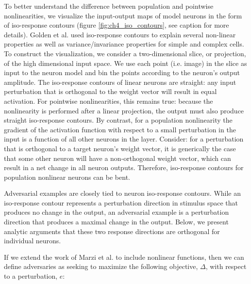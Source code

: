 To better understand the difference between population and pointwise nonlinearities, we visualize the input-output maps of model neurons in the form of iso-response contours (figure \ref{fig:ch4_iso_contours}, see caption for more details). Golden et al. \citeyearpar{golden2016conjectures} used iso-response contours to explain several non-linear properties as well as variance/invariance properties for simple and complex cells. To construct the visualization, we consider a two-dimensional slice, or projection, of the high dimensional input space. We use each point (i.e. image) in the slice as input to the neuron model and bin the points according to the neuron's output amplitude. The iso-response contours of linear neurons are straight: any input perturbation that is orthogonal to the weight vector will result in equal activation. For pointwise nonlinearities, this remains true: because the nonlinearity is performed after a linear projection, the output must also produce straight iso-response contours. By contrast, for a population nonlinearity the gradient of the activation function with respect to a small perturbation in the input is a function of all other neurons in the layer. Consider: for a perturbation that is orthogonal to a target neuron's weight vector, it is generically the case that some other neuron will have a non-orthogonal weight vector, which can result in a net change in all neuron outputs. Therefore, iso-response contours for population nonlinear neurons can be bent.

Adversarial examples are closely tied to neuron iso-response contours. While an iso-response contour represents a perturbation direction in stimulus space that produces no change in the output, an adversarial example is a perturbation direction that produces a maximal change in the output. Below, we present analytic arguments that these two response directions are orthogonal for individual neurons.

If we extend the work of Marzi et al. \citeyearpar{marzi2018sparsity} to include nonlinear functions, then we can define adversaries as seeking to maximize the following objective, $\Delta$, with respect to a perturbation, $e$:

